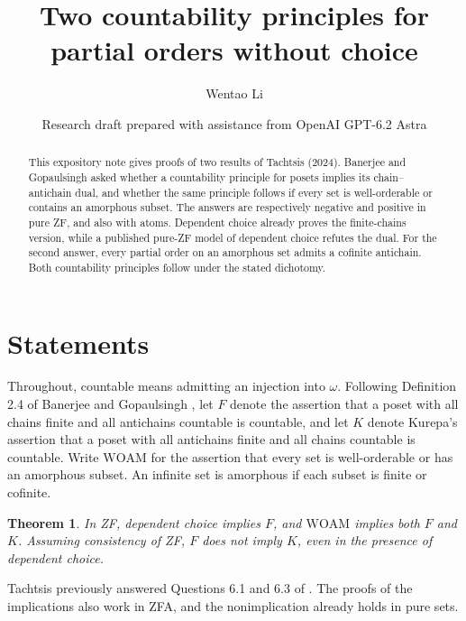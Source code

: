 \documentclass[11pt]{article}
\title{Two countability principles for partial orders without choice}
\author{Wentao Li}
\date{Research draft prepared with assistance from OpenAI GPT-6.2 Astra}
\newtheorem{theorem}{Theorem}
\begin{document}
\maketitle
\begin{abstract}
This expository note gives proofs of two results of Tachtsis (2024). Banerjee and Gopaulsingh asked whether a countability principle for posets implies its chain--antichain dual, and whether the same principle follows if every set is well-orderable or contains an amorphous subset. The answers are respectively negative and positive in pure ZF, and also with atoms. Dependent choice already proves the finite-chains version, while a published pure-ZF model of dependent choice refutes the dual. For the second answer, every partial order on an amorphous set admits a cofinite antichain. Both countability principles follow under the stated dichotomy.
\end{abstract}

\section{Statements}
Throughout, countable means admitting an injection into $\omega$. Following Definition 2.4 of Banerjee and Gopaulsingh \cite{bg}, let $F$ denote the assertion that a poset with all chains finite and all antichains countable is countable, and let $K$ denote Kurepa's assertion that a poset with all antichains finite and all chains countable is countable. Write $\mathrm{WOAM}$ for the assertion that every set is well-orderable or has an amorphous subset. An infinite set is amorphous if each subset is finite or cofinite.
\begin{theorem}
In ZF, dependent choice implies $F$, and $\mathrm{WOAM}$ implies both $F$ and $K$. Assuming consistency of ZF, $F$ does not imply $K$, even in the presence of dependent choice.
\end{theorem}
Tachtsis \cite{t24} previously answered Questions 6.1 and 6.3 of \cite{bg}. The proofs of the implications also work in ZFA, and the nonimplication already holds in pure sets.
\end{document}
